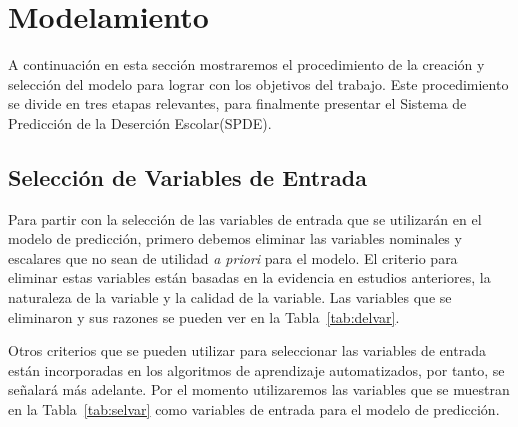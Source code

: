 \section{Modelamiento}
A continuación en esta sección mostraremos el procedimiento de la creación y selección del modelo para lograr con los objetivos del trabajo.
Este procedimiento se divide en tres etapas relevantes, para finalmente presentar el Sistema de Predicción de la Deserción Escolar(SPDE).
\subsection{Selección de Variables de Entrada}
Para partir con la selección de las variables de entrada que se utilizarán en el modelo de predicción, primero debemos eliminar las variables nominales y escalares que no sean de utilidad \textit{a priori} para el modelo.
El criterio para eliminar estas variables están basadas en la evidencia en estudios anteriores, la naturaleza de la variable y la calidad de la variable. Las variables que se eliminaron y sus razones se pueden ver en la Tabla~\ref{tab:delvar}.

Otros criterios que se pueden utilizar para seleccionar las variables de entrada están incorporadas en los algoritmos de aprendizaje automatizados, por tanto, se señalará más adelante. Por el momento utilizaremos las variables que se muestran en la Tabla~\ref{tab:selvar} como variables de entrada para el modelo de predicción.

